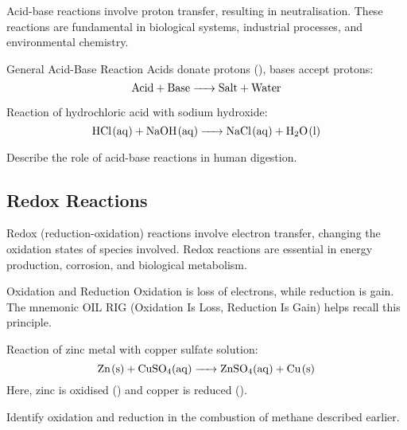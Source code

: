 Acid-base reactions involve proton transfer, resulting in neutralisation. These reactions are fundamental in biological systems, industrial processes, and environmental chemistry.

\begin{keyconcept}{General Acid-Base Reaction}
Acids donate protons (), bases accept protons:
\[
\ce{Acid + Base -> Salt + Water}
\]
\end{keyconcept}

\begin{example}
Reaction of hydrochloric acid with sodium hydroxide:
\[
\ce{HCl(aq) + NaOH(aq) -> NaCl(aq) + H2O(l)}
\]
\end{example}

\begin{stopandthink}
Describe the role of acid-base reactions in human digestion.
\end{stopandthink}

\subsection{Redox Reactions}
\FloatBarrier
\FloatBarrier
\FloatBarrier

Redox (reduction-oxidation) reactions involve electron transfer, changing the oxidation states of species involved. Redox reactions are essential in energy production, corrosion, and biological metabolism.

\begin{keyconcept}{Oxidation and Reduction}
Oxidation is loss of electrons, while reduction is gain. The mnemonic OIL RIG (Oxidation Is Loss, Reduction Is Gain) helps recall this principle.
\end{keyconcept}

\begin{example}
Reaction of zinc metal with copper sulfate solution:
\[
\ce{Zn(s) + CuSO4(aq) -> ZnSO4(aq) + Cu(s)}
\]
Here, zinc is oxidised () and copper is reduced ().
\end{example}

\begin{stopandthink}
Identify oxidation and reduction in the combustion of methane described earlier.
\end{stopandthink}

